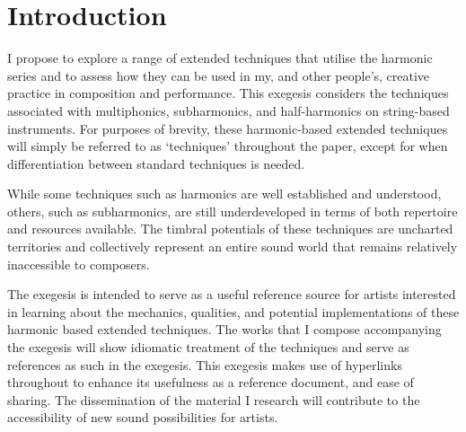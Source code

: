 \section{Introduction}


\doublespace{}

I propose to explore a range of extended techniques that utilise the harmonic series and to assess how they can be used in my, and other people's, creative practice in composition and performance. 
This exegesis considers the techniques associated with multiphonics, subharmonics, and half-harmonics on string-based instruments.
For purposes of brevity, these harmonic-based extended techniques will simply be referred to as `techniques' throughout the paper, except for when differentiation between standard techniques is needed.

While some techniques such as harmonics are well established and understood, others, such as subharmonics, are still underdeveloped in terms of both repertoire and resources available. 
The timbral potentials of these techniques are uncharted territories and collectively represent an entire sound world that remains relatively inaccessible to composers.



The exegesis is intended to serve as a useful reference source for artists interested in learning about the mechanics, qualities, and potential implementations of these harmonic based extended techniques. 
The works that I compose accompanying the exegesis will show idiomatic treatment of the techniques and serve as references as such in the exegesis.
This exegesis makes use of hyperlinks throughout to enhance its usefulness as a reference document, and ease of sharing.
The dissemination of the material I research will contribute to the accessibility of new sound possibilities for artists.

